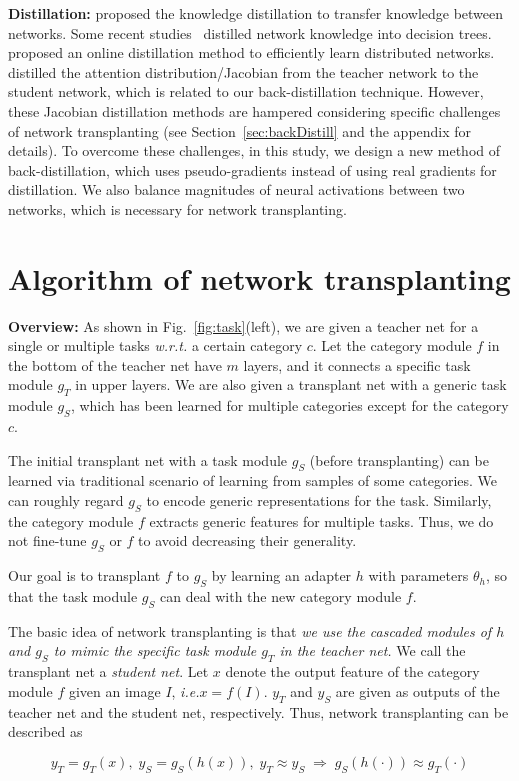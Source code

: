 \documentclass[10pt,twocolumn,letterpaper]{article}
\begin{document}
\textbf{Distillation:} \cite{distill} proposed the knowledge distillation to transfer knowledge between networks. Some recent studies~\cite{distillDecisionTree,RNNTree} distilled network knowledge into decision trees. \cite{distillDistributed} proposed an online distillation method to efficiently learn distributed networks. \cite{distillAttention,distillJacobian} distilled the attention distribution/Jacobian from the teacher network to the student network, which is related to our back-distillation technique. However, these Jacobian distillation methods are hampered considering specific challenges of network transplanting (see Section~\ref{sec:backDistill} and the appendix for details). To overcome these challenges, in this study, we design a new method of back-distillation, which uses pseudo-gradients instead of using real gradients for distillation. We also balance magnitudes of neural activations between two networks, which is necessary for network transplanting.

\section{Algorithm of network transplanting}

\textbf{Overview:} As shown in Fig.~\ref{fig:task}(left), we are given a teacher net for a single or multiple tasks \emph{w.r.t.} a certain category $c$. Let the category module $f$ in the bottom of the teacher net have $m$ layers, and it connects a specific task module {\small$g_{T}$} in upper layers. We are also given a transplant net with a generic task module {\small$g_{S}$}, which has been learned for multiple categories except for the category $c$.

The initial transplant net with a task module {\small$g_{S}$} (before transplanting) can be learned via traditional scenario of learning from samples of some categories. We can roughly regard {\small$g_{S}$} to encode generic representations for the task. Similarly, the category module $f$ extracts generic features for multiple tasks. Thus, we do not fine-tune {\small$g_{S}$} or $f$ to avoid decreasing their generality.

Our goal is to transplant $f$ to {\small$g_{S}$} by learning an adapter $h$ with parameters $\theta_{h}$, so that the task module {\small$g_{S}$} can deal with the new category module $f$.

The basic idea of network transplanting is that \textit{we use the cascaded modules of $h$ and {\small$g_{S}$} to mimic the specific task module {\small$g_{T}$} in the teacher net.} We call the transplant net a \textit{student net}. Let $x$ denote the output feature of the category module $f$ given an image $I$, \emph{i.e.}{\small$x=f(I)$}. {\small$y_{T}$} and {\small$y_{S}$} are given as outputs of the teacher net and the student net, respectively. Thus, network transplanting can be described as
\begin{small}
\begin{equation}
\!y_{T}\!=\!g_{T}(x),\; y_{S}\!=\!g_{S}(h(x)), \; y_{T}\!\approx\!y_{S} \;\Rightarrow\; g_{S}(h(\cdot))\!\approx\!g_{T}(\cdot)\!\!\!
\end{equation}
\end{small}
\end{document}
